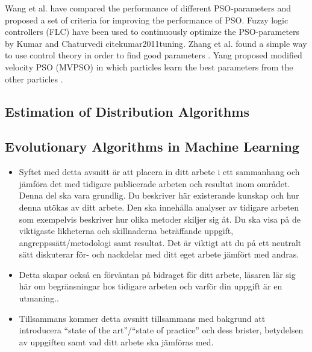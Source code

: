 Wang et al. \cite{dang2012selection} have compared the performance of different PSO-parameters and proposed a set of criteria for improving the performance of PSO. Fuzzy logic controllers (FLC) have been used to continuously optimize the PSO-parameters by Kumar and Chaturvedi cite{kumar2011tuning}. Zhang et al. found a simple way to use control theory in order to find good parameters \cite{zhang2011simple}. Yang proposed modified velocity PSO (MVPSO) in which particles learn the best parameters from the other particles \cite{yang2011particle}.


\subsection{Estimation of Distribution Algorithms}

\subsection{Evolutionary Algorithms in Machine Learning}




{\color{blue}
\begin{itemize}
  \item Syftet med detta avsnitt \"ar att placera in ditt arbete i ett sammanhang och j\"amf\"ora det med tidigare publicerade arbeten och resultat inom omr\r{a}det. Denna del ska vara grundlig. Du beskriver h\"ar existerande kunskap och hur denna ut\"okas av ditt arbete. Den ska inneh\r{a}lla analyser av tidigare arbeten som exempelvis beskriver hur olika metoder skiljer sig \r{a}t. Du ska visa p\r{a} de viktigaste likheterna och skillnaderna betr\"affande uppgift, angreppss\"att/metodologi samt resultat. Det \"ar viktigt att du p\r{a} ett neutralt s\"att diskuterar f\"or- och nackdelar med ditt eget arbete j\"amf\"ort med andras.
  \item Detta skapar ocks\r{a} en f\"orv\"antan p\r{a} bidraget f\"or ditt arbete, l\"asaren l\"ar sig h\"ar om begr\"ansningar hos tidigare arbeten och varf\"or din uppgift \"ar en utmaning..
  \item Tillsammans kommer detta avsnitt tillsammans med bakgrund att introducera ``state of the art''/``state of practice'' och dess brister, betydelsen av uppgiften samt vad ditt arbete ska j\"amf\"oras med.
\end{itemize}




}
